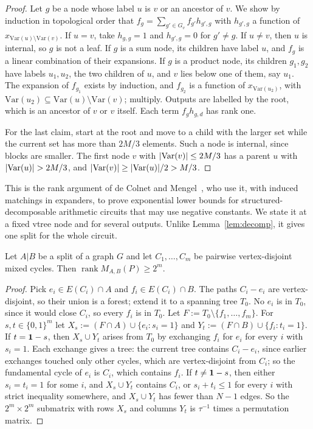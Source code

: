 \begin{proof}
Let $g$ be a node whose label $u$ is $v$ or an ancestor of $v$. We show by induction in topological order that $f_g=\sum_{g'\in G_v}f_{g'}h_{g',g}$ with $h_{g',g}$ a function of $x_{\mathrm{Var}(u)\setminus\mathrm{Var}(v)}$. If $u=v$, take $h_{g,g}=1$ and $h_{g',g}=0$ for $g'\ne g$. If $u\ne v$, then $u$ is internal, so $g$ is not a leaf. If $g$ is a sum node, its children have label $u$, and $f_g$ is a linear combination of their expansions. If $g$ is a product node, its children $g_1,g_2$ have labels $u_1,u_2$, the two children of $u$, and $v$ lies below one of them, say $u_1$. The expansion of $f_{g_1}$ exists by induction, and $f_{g_2}$ is a function of $x_{\mathrm{Var}(u_2)}$, with $\mathrm{Var}(u_2)\subseteq\mathrm{Var}(u)\setminus\mathrm{Var}(v)$; multiply. Outputs are labelled by the root, which is an ancestor of $v$ or $v$ itself. Each term $f_gh_{g,d}$ has rank one.

For the last claim, start at the root and move to a child with the larger set while the current set has more than $2M/3$ elements. Such a node is internal, since blocks are smaller. The first node $v$ with $\lvert \mathrm{Var}(v)\rvert\le2M/3$ has a parent $u$ with $\lvert \mathrm{Var}(u)\rvert>2M/3$, and $\lvert \mathrm{Var}(v)\rvert\ge\lvert \mathrm{Var}(u)\rvert/2>M/3$.
\end{proof}

This is the rank argument of de Colnet and Mengel~\cite[Theorem~2 and Lemma~13]{DeColnetMengel21}, who use it, with induced matchings in expanders, to prove exponential lower bounds for structured-decomposable arithmetic circuits that may use negative constants. We state it at a fixed vtree node and for several outputs. Unlike Lemma~\ref{lem:decomp}, it gives one split for the whole circuit.

\begin{theorem}\label{thm:signed-rank}
Let $A|B$ be a split of a graph $G$ and let $C_1,\dots,C_m$ be pairwise vertex-disjoint mixed cycles. Then $\operatorname{rank}M_{A,B}(P)\ge2^m$.
\end{theorem}

\begin{proof}
Pick $e_i\in E(C_i)\cap A$ and $f_i\in E(C_i)\cap B$. The paths $C_i-e_i$ are vertex-disjoint, so their union is a forest; extend it to a spanning tree $T_0$. No $e_i$ is in $T_0$, since it would close $C_i$, so every $f_i$ is in $T_0$. Let $F:=T_0\setminus\{f_1,\dots,f_m\}$. For $s,t\in\{0,1\}^m$ let $X_s:=(F\cap A)\cup\{e_i:s_i=1\}$ and $Y_t:=(F\cap B)\cup\{f_i:t_i=1\}$. If $t=\mathbf{1}-s$, then $X_s\cup Y_t$ arises from $T_0$ by exchanging $f_i$ for $e_i$ for every $i$ with $s_i=1$. Each exchange gives a tree: the current tree contains $C_i-e_i$, since earlier exchanges touched only other cycles, which are vertex-disjoint from $C_i$; so the fundamental cycle of $e_i$ is $C_i$, which contains $f_i$. If $t\ne\mathbf{1}-s$, then either $s_i=t_i=1$ for some $i$, and $X_s\cup Y_t$ contains $C_i$, or $s_i+t_i\le1$ for every $i$ with strict inequality somewhere, and $X_s\cup Y_t$ has fewer than $N-1$ edges. So the $2^m\times2^m$ submatrix with rows $X_s$ and columns $Y_t$ is $\tau^{-1}$ times a permutation matrix.
\end{proof}

